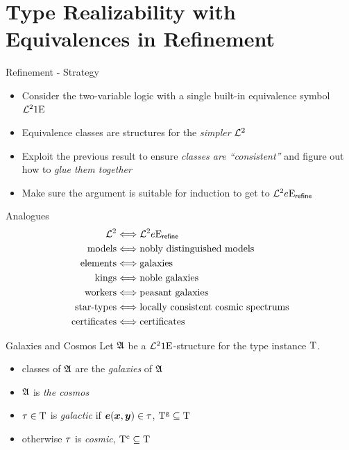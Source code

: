 \documentclass{beamer}
\begin{document}
\section{Type Realizability with Equivalences in Refinement}
\begin{frame}{Refinement - Strategy}
\begin{itemize}
  \item Consider the two-variable logic with a single built-in equivalence symbol
  $\mathcal{L}^{2}{1}\mathrm{E}_{{}}$
  \item Equivalence classes are structures for the \emph{simpler} $\mathcal{L}^{2}$
  \item Exploit the previous result to ensure \emph{classes are ``consistent''} and
  figure out how to
  \emph{glue them together}
  \item Make sure the argument is suitable for induction to get to
  $\mathcal{L}^{2}{e}\mathrm{E}_{\mathsf{refine}}$
\end{itemize}
\end{frame}

\begin{frame}{Analogues}
\begin{align*}
  \mathcal{L}^{2} &\Longleftrightarrow \mathcal{L}^{2}{e}\mathrm{E}_{\mathsf{refine}} \\
  \text{models} &\Longleftrightarrow \text{nobly distinguished models} \\
  \text{elements} &\Longleftrightarrow \text{galaxies} \\
  \text{kings} &\Longleftrightarrow \text{noble galaxies} \\
  \text{workers} &\Longleftrightarrow \text{peasant galaxies} \\
  \text{star-types} &\Longleftrightarrow \text{locally consistent cosmic
  spectrums} \\
  \text{certificates} &\Longleftrightarrow \text{certificates}
\end{align*}
\end{frame}

\begin{frame}{Galaxies and Cosmos}
Let $\mathfrak{A}$ be a $\mathcal{L}^{2}{1}\mathrm{E}_{{}}$-structure for the type instance $\mathrm{T}$.
\begin{itemize}
  \item classes of $\mathfrak{A}$ are the \emph{galaxies} of $\mathfrak{A}$
  \item $\mathfrak{A}$ is \emph{the cosmos}
  \item $\tau\in\mathrm{T}$ is \emph{galactic} if $\bm{e}(\bm{x},\bm{y})\in\tau$,
  $\mathrm{T}^{\mathrm{g}}\subseteq\mathrm{T}$
  \item otherwise $\tau$ is \emph{cosmic}, $\mathrm{T}^{\mathrm{c}}\subseteq\mathrm{T}$
\end{itemize}
\end{frame}
\end{document}
